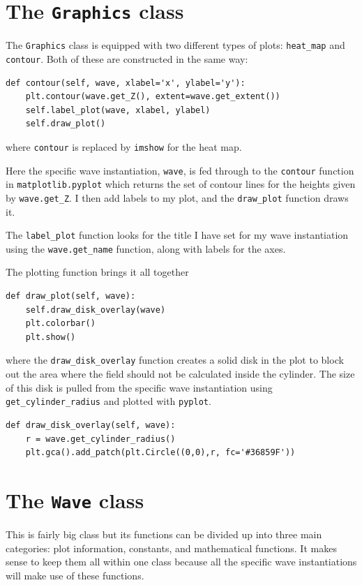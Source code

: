 \section{The \texttt{Graphics} class}
%
The \verb!Graphics! class is equipped with two different types of plots: \verb!heat_map! and \verb!contour!. Both of these are constructed in the same way:
%
  \begin{lstlisting}[caption={},label={lst:contour}]
def contour(self, wave, xlabel='x', ylabel='y'):
    plt.contour(wave.get_Z(), extent=wave.get_extent())
    self.label_plot(wave, xlabel, ylabel)
    self.draw_plot() \end{lstlisting}
%
where \verb!contour! is replaced by \verb!imshow! for the heat map. \par
%
Here the specific wave instantiation, \verb!wave!, is fed through to the \verb!contour! function in \verb!matplotlib.pyplot! which returns the set of contour lines for the heights given by \verb!wave.get_Z!. I then add labels to my plot, and the \verb!draw_plot! function draws it. \par
%
The \verb!label_plot! function looks for the title I have set for my wave instantiation using the \verb!wave.get_name! function, along with labels for the axes. \par
%
The plotting function brings it all together
%
  \begin{lstlisting}
def draw_plot(self, wave):
    self.draw_disk_overlay(wave)
    plt.colorbar()
    plt.show()\end{lstlisting}
%
where the \verb!draw_disk_overlay! function creates a solid disk in the plot to block out the area where the field should not be calculated inside the cylinder. The size of this disk is pulled from the specific wave instantiation using \verb!get_cylinder_radius! and plotted with \verb!pyplot!.
%
\begin{lstlisting}
def draw_disk_overlay(self, wave):
    r = wave.get_cylinder_radius()
    plt.gca().add_patch(plt.Circle((0,0),r, fc='#36859F'))
\end{lstlisting}
%
\section{The \texttt{Wave} class}
%
This is fairly big class but its functions can be divided up into three main categories: plot information, constants, and mathematical functions. It makes sense to keep them all within one class because all the specific wave instantiations will make use of these functions. \par
%
